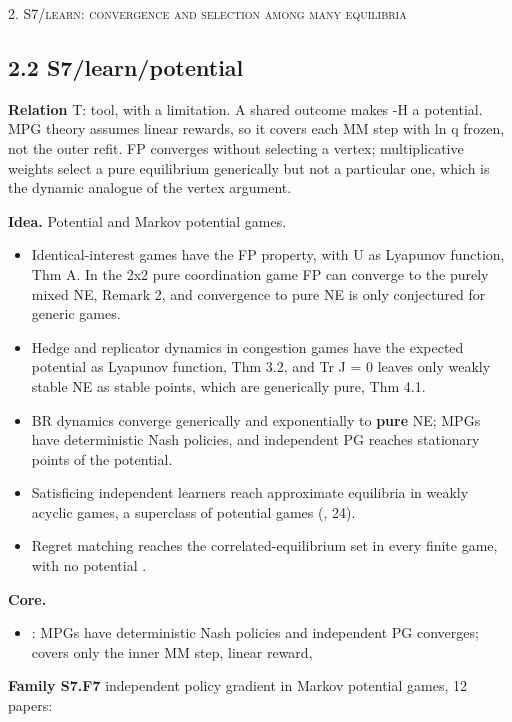 \documentclass[10pt]{article}
\newcommand{\memb}[1]{\par\smallskip\textbf{#1}\quad}
\begin{document}
\medskip\textsc{2. S7/learn: convergence and selection among many equilibria}

\subsection{2.2 S7/learn/potential}\label{node:S7-S7-learn-potential}
\textbf{Relation} \textsf{T}: tool, with a limitation. A shared outcome makes -H a potential. MPG theory assumes linear rewards, so it covers each MM step with ln q frozen, not the outer refit. FP converges without selecting a vertex; multiplicative weights select a pure equilibrium generically but not a particular one, which is the dynamic analogue of the vertex argument.

\textbf{Idea.} Potential and Markov potential games.
\begin{itemize}[nosep,leftmargin=1.2em]
\item Identical-interest games have the FP property, with U as Lyapunov function, \citet{MondererShapley-fictitious96} Thm A. In the 2x2 pure coordination game FP can converge to the purely mixed NE, Remark 2, and convergence to pure NE is only conjectured for generic games.
\item Hedge and replicator dynamics in congestion games have the expected potential as Lyapunov function, \citet{Kleinberg-multiplicative09} Thm 3.2, and Tr J = 0 leaves only weakly stable NE as stable points, which are generically pure, Thm 4.1.
\item BR dynamics converge generically and exponentially to \textbf{pure} NE; MPGs have deterministic Nash policies, and independent PG reaches stationary points of the potential.
\item Satisficing independent learners reach approximate equilibria in weakly acyclic games, a superclass of potential games (\citet{Yongacoglu-satisficing23}, 24).
\item Regret matching reaches the correlated-equilibrium set in every finite game, with no potential \citep{Hart-simple00}.
\end{itemize}


\memb{Core.}
\begin{itemize}[nosep,leftmargin=1.2em]
\item \citet{Leonardos-global21}: MPGs have deterministic Nash policies and independent PG converges; covers only the inner MM step, linear reward,
\end{itemize}
\memb{Family S7.F7} independent policy gradient in Markov potential games, 12 papers: {\footnotesize \citetext{\citealp{Leonardos-global21}; \citealp{Macua-learning18}; \citealp{Cen-independent22}; \citealp{Chen-convergence22}; \citealp{Ding-independent22}; \citealp{Fox-independent21}; \citealp{Maheshwari-independent22}; \citealp{Zhang-global22}; \citealp{Sun-provably23}; \citealp{Alatur-independent24}; \citealp{Cheng-provable24}; \citealp{Jordan-independent24}}}
\end{document}

